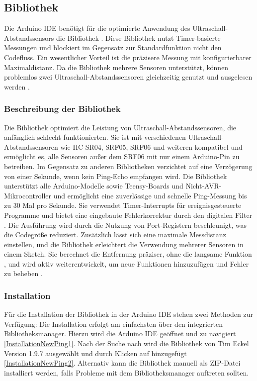 \subsection{Bibliothek }\label{NewPingBibliothek}

Die Arduino IDE benötigt für die optimierte Anwendung des Ultraschall-Abstandssensors die Bibliothek . Diese Bibliothek nutzt Timer-basierte Messungen und blockiert im Gegensatz zur Standardfunktion  nicht den Codefluss. Ein wesentlicher Vorteil ist die präzisere Messung mit konfigurierbarer Maximaldistanz. Da die Bibliothek mehrere Sensoren unterstützt, können problemlos zwei Ultraschall-Abstandssensoren gleichzeitig genutzt und ausgelesen werden \cite{Bakker:2021}.

\subsubsection{Beschreibung der Bibliothek }
Die Bibliothek  optimiert die Leistung von Ultraschall-Abstandssensoren, die anfänglich schlecht funktionierten. Sie ist mit verschiedenen Ultraschall-Abstandssensoren wie HC-SR04, SRF05, SRF06 und weiteren kompatibel und ermöglicht es, alle Sensoren außer dem SRF06 mit nur einem Arduino-Pin zu betreiben. Im Gegensatz zu anderen Bibliotheken verzichtet  auf eine Verzögerung von einer Sekunde, wenn kein Ping-Echo empfangen wird. Die Bibliothek unterstützt alle Arduino-Modelle sowie Teensy-Boards und Nicht-AVR-Mikrocontroller und ermöglicht eine zuverlässige und schnelle Ping-Messung bis zu 30 Mal pro Sekunde. Sie verwendet Timer-Interrupts für ereignisgesteuerte Programme und bietet eine eingebaute Fehlerkorrektur durch den digitalen Filter . Die Ausführung wird durch die Nutzung von Port-Registern beschleunigt, was die Codegröße reduziert. Zusätzlich lässt sich eine maximale Messdistanz einstellen, und die Bibliothek erleichtert die Verwendung mehrerer Sensoren in einem Sketch. Sie berechnet die Entfernung präziser, ohne die langsame Funktion , und wird aktiv weiterentwickelt, um neue Funktionen hinzuzufügen und Fehler zu beheben \cite{Eckel:2023}.

\subsubsection{Installation}

Für die Installation der Bibliothek   in der Arduino IDE stehen zwei Methoden zur Verfügung: Die Installation erfolgt am einfachsten über den integrierten Bibliotheksmanager. Hierzu wird die Arduino IDE geöffnet und zu  navigiert \ref{InstallationNewPing1}. Nach der Suche nach  wird die Bibliothek  von Tim Eckel Version 1.9.7 ausgewählt und durch Klicken auf  hinzugefügt \ref{InstallationNewPing2}. Alternativ kann die Bibliothek manuell als ZIP-Datei installiert werden, falls Probleme mit dem Bibliotheksmanager auftreten sollten. 

